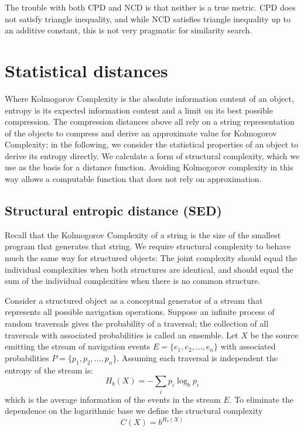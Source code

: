 The trouble with both CPD and NCD is that neither is a true metric.  CPD does not satisfy triangle inequality, and while NCD satisfies triangle inequality up to an additive constant, this is not very pragmatic for similarity search.
\section{Statistical distances}
%
Where Kolmogorov Complexity is the absolute information content of an object, entropy is its expected information content and a limit on its best possible compression\cite{}.  The compression distances above all rely on a string representation of the objects to compress and derive an approximate value for Kolmogorov Complexity; in the following, we consider the statistical properties of an object to derive its entropy directly. We calculate a form of structural complexity, which we use as the basis for a distance function.  Avoiding Kolmogorov complexity in this way allows a computable function that does not rely on approximation.

\subsection{Structural entropic distance (SED)}
%
Recall that the Kolmogorov Complexity of a string is the size of the smallest program that generates that string.  We require structural complexity  to behave much the same way for structured objects: The joint complexity should equal the individual complexities when both structures are identical, and should equal the sum of the individual complexities when there is no common structure.  

Consider a structured object as a conceptual generator of a stream that represents all possible navigation operations.  Suppose an infinite process of random traversals gives the probability of a traversal; the collection of all traversals with associated probabilities is called an ensemble.  Let $X$ be the source emitting the stream of navigation events $E = \{ e_1, e_2, \ldots, e_n \}$ with associated probabilities $P = \{ p_1, p_2, \ldots, p_n\}$. Assuming each traversal is independent the entropy of the stream is:  
\begin{equation}
	H_b(X) = -\sum_i p_i \log_b p_i
\end{equation}
which is the average information of the events in the stream $E$.  To eliminate the dependence on the logarithmic base we define the structural complexity
\begin{equation}
	C(X) = b^{H_b(X)}
\end{equation} 

